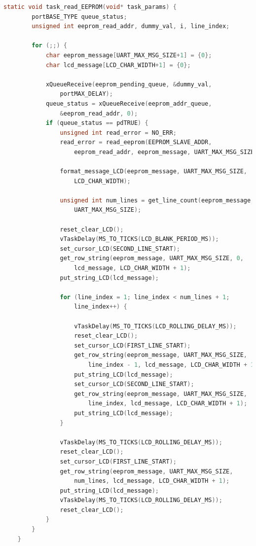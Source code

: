 \documentclass[a4paper, 12pt]{article}
\begin{document}
	\begin{mdframed}[backgroundcolor=code-gray, roundcorner=10pt,
								innerleftmargin=5, innertopmargin=5, innerbottommargin=5]	
	\begin{lstlisting}[language=C, caption=EEPROM Reading Task, tabsize=2, label={lst:task-read-eeprom}]
	static void task_read_EEPROM(void* task_params) {
		portBASE_TYPE queue_status;
		unsigned int eeprom_read_addr, dummy_val, i, line_index;

		for (;;) {
			char eeprom_message[UART_MAX_MSG_SIZE+1] = {0};
			char lcd_message[LCD_CHAR_WIDTH+1] = {0};

			xQueueReceive(eeprom_pending_queue, &dummy_val,
				portMAX_DELAY);
			queue_status = xQueueReceive(eeprom_addr_queue,
				&eeprom_read_addr, 0);
			if (queue_status == pdTRUE) {
				unsigned int read_error = NO_ERR;
				read_error = read_eeprom(EEPROM_SLAVE_ADDR,
					eeprom_read_addr, eeprom_message, UART_MAX_MSG_SIZE);

				format_message_LCD(eeprom_message, UART_MAX_MSG_SIZE,
					LCD_CHAR_WIDTH);
			
				unsigned int num_lines = get_line_count(eeprom_message,
					UART_MAX_MSG_SIZE);
			
				reset_clear_LCD();
				vTaskDelay(MS_TO_TICKS(LCD_BLANK_PERIOD_MS));
				set_cursor_LCD(SECOND_LINE_START);
				get_row_string(eeprom_message, UART_MAX_MSG_SIZE, 0,
					lcd_message, LCD_CHAR_WIDTH + 1);
				put_string_LCD(lcd_message);
			
				for (line_index = 1; line_index < num_lines + 1;
					line_index++) {
					
					vTaskDelay(MS_TO_TICKS(LCD_ROLLING_DELAY_MS));
					reset_clear_LCD();
					set_cursor_LCD(FIRST_LINE_START);
					get_row_string(eeprom_message, UART_MAX_MSG_SIZE,
						line_index - 1, lcd_message, LCD_CHAR_WIDTH + 1);
					put_string_LCD(lcd_message);
					set_cursor_LCD(SECOND_LINE_START);
					get_row_string(eeprom_message, UART_MAX_MSG_SIZE,
						line_index, lcd_message, LCD_CHAR_WIDTH + 1);
					put_string_LCD(lcd_message);
				}
			
				vTaskDelay(MS_TO_TICKS(LCD_ROLLING_DELAY_MS));
				reset_clear_LCD();	
				set_cursor_LCD(FIRST_LINE_START);
				get_row_string(eeprom_message, UART_MAX_MSG_SIZE,
					num_lines, lcd_message, LCD_CHAR_WIDTH + 1);
				put_string_LCD(lcd_message);
				vTaskDelay(MS_TO_TICKS(LCD_ROLLING_DELAY_MS));
				reset_clear_LCD();
			}
		}
	}
	\end{lstlisting}
	\end{mdframed}
\end{document}
